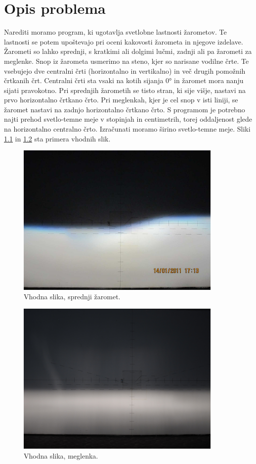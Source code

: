 \documentclass[oneside, a4paper, 12pt]{book}
\begin{document}
\chapter{Opis problema}
Narediti moramo program, ki ugotavlja svetlobne lastnosti žarometov. Te lastnosti se potem upoštevajo pri oceni kakovosti žarometa in njegove izdelave. Žarometi so lahko sprednji, s kratkimi ali dolgimi lučmi, zadnji ali pa žarometi za meglenke. Snop iz žarometa usmerimo na steno, kjer so narisane vodilne črte. Te vsebujejo dve centralni črti (horizontalno in vertikalno) in več drugih pomožnih črtkanih črt. Centralni črti sta vsaki na kotih sijanja 0° in žaromet mora nanju sijati pravokotno. Pri sprednjih žarometih se tisto stran, ki sije višje, nastavi na prvo horizontalno črtkano črto. Pri meglenkah, kjer je cel snop v isti liniji, se žaromet nastavi na zadnjo horizontalno črtkano črto. S programom je potrebno najti prehod svetlo-temne meje v stopinjah in centimetrih, torej oddaljenost glede na horizontalno centralno črto. Izračunati moramo širino svetlo-temne meje. Sliki \ref{pic:vhp1} in \ref{pic:vhp2} sta primera vhodnih slik.

\begin{figure}
\begin{center}
\includegraphics[width=10cm]{slike/original.jpg}
\end{center}
\caption{Vhodna slika, sprednji žaromet.}
\label{pic:vhp1}
\end{figure}

\begin{figure}
\begin{center}
\includegraphics[width=10cm]{slike/levi3.JPG}
\end{center}
\caption{Vhodna slika, meglenka.}
\label{pic:vhp2}
\end{figure}
\end{document}
